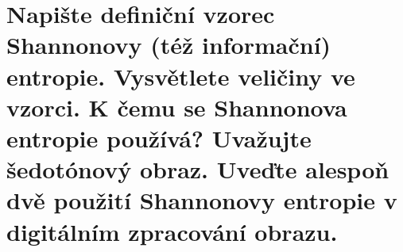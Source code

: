 \section{Napište definiční vzorec Shannonovy (též informační) entropie. Vysvětlete veličiny ve vzorci. K čemu se 
Shannonova entropie používá? Uvažujte šedotónový obraz. Uveďte alespoň dvě použití Shannonovy entropie v digitálním 
zpracování obrazu.}